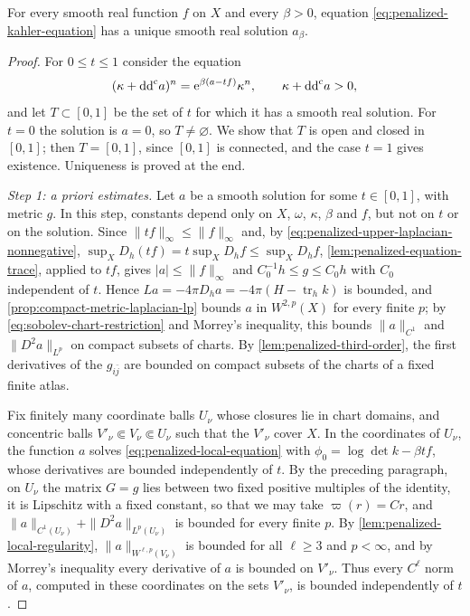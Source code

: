 \begin{theorem}\label{thm:smooth-penalized-kahler-equation}
For every smooth real function $f$ on $X$ and every $\beta>0$, equation \eqref{eq:penalized-kahler-equation} has a unique smooth real solution $a_\beta$.
\end{theorem}
\begin{proof}
For $0\leq t\leq1$ consider the equation
\[
 (\kappa+\mathrm{dd}^{\mathrm{c}} a)^n=\mathrm e^{\beta(a-tf)}\kappa^n,
 \qquad \kappa+\mathrm{dd}^{\mathrm{c}} a>0,
\]
and let $T\subset[0,1]$ be the set of $t$ for which it has a smooth real solution. For $t=0$ the solution is $a=0$, so $T\neq\varnothing$. We show that $T$ is open and closed in $[0,1]$; then $T=[0,1]$, since $[0,1]$ is connected, and the case $t=1$ gives existence. Uniqueness is proved at the end.

\emph{Step 1: a priori estimates.} Let $a$ be a smooth solution for some $t\in[0,1]$, with metric $g$. In this step, constants depend only on $X$, $\omega$, $\kappa$, $\beta$ and $f$, but not on $t$ or on the solution. Since $\|tf\|_\infty\leq\|f\|_\infty$ and, by \eqref{eq:penalized-upper-laplacian-nonnegative}, $\sup_XD_h(tf)=t\sup_XD_hf\leq\sup_XD_hf$, \cref{lem:penalized-equation-trace}, applied to $tf$, gives $|a|\leq\|f\|_\infty$ and $C_0^{-1}h\leq g\leq C_0h$ with $C_0$ independent of $t$. Hence $La=-4\pi D_ha=-4\pi(H-\operatorname{tr}_hk)$ is bounded, and \cref{prop:compact-metric-laplacian-lp} bounds $a$ in $W^{2,p}(X)$ for every finite $p$; by \eqref{eq:sobolev-chart-restriction} and Morrey's inequality, this bounds $\|a\|_{C^1}$ and $\|D^2a\|_{L^p}$ on compact subsets of charts. By \cref{lem:penalized-third-order}, the first derivatives of the $g_{i\bar j}$ are bounded on compact subsets of the charts of a fixed finite atlas.

Fix finitely many coordinate balls $U_\nu$ whose closures lie in chart domains, and concentric balls $V'_\nu\Subset V_\nu\Subset U_\nu$ such that the $V'_\nu$ cover $X$. In the coordinates of $U_\nu$, the function $a$ solves \eqref{eq:penalized-local-equation} with $\phi_0=\log\det k-\beta tf$, whose derivatives are bounded independently of $t$. By the preceding paragraph, on $U_\nu$ the matrix $G=g$ lies between two fixed positive multiples of the identity, it is Lipschitz with a fixed constant, so that we may take $\varpi(r)=Cr$, and $\|a\|_{C^1(U_\nu)}+\|D^2a\|_{L^p(U_\nu)}$ is bounded for every finite $p$. By \cref{lem:penalized-local-regularity}, $\|a\|_{W^{\ell,p}(V_\nu)}$ is bounded for all $\ell\geq3$ and $p<\infty$, and by Morrey's inequality every derivative of $a$ is bounded on $V'_\nu$. Thus every $C^\ell$ norm of $a$, computed in these coordinates on the sets $V'_\nu$, is bounded independently of $t$.


\end{proof}
